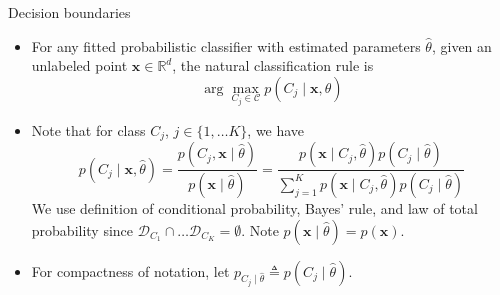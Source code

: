 \documentclass{beamer}
\numberwithin{equation}{section}
\begin{document}
\begin{frame}{Decision boundaries}
    \begin{itemize}
        \item
        For any fitted probabilistic classifier with estimated parameters
        $ \hat{\theta} $, given an unlabeled point $ \mathbf{x} \in
        \mathbb{R}^d $, the natural classification rule is
        \begin{equation} \label{class_rule}
            \arg\max_{C_j \in \mathcal{C}}p(C_j \mid \mathbf{x}, \hat{\theta})
        \end{equation}

        \item
        Note that for class $ C_j $, $ j \in \{1, \ldots K\} $, we have
        \begin{equation}
            p(C_j \mid \mathbf{x}, \hat{\theta}) =
            \frac{p(C_j, \mathbf{x} \mid \hat{\theta})}{
                p(\mathbf{x} \mid \hat{\theta})
            } = \frac{
                p(\mathbf{x} \mid C_j, \hat{\theta})p(C_j \mid \hat{\theta})
            }{
                \sum_{j = 1}^Kp(\mathbf{x} \mid C_j, \hat{\theta})
                p(C_j \mid \hat{\theta})
            }
        \end{equation}
        We use definition of conditional probability, Bayes' rule, and law of
        total probability since $ \mathcal{D}_{C_1} \cap \ldots
        \mathcal{D}_{C_K} = \emptyset $. Note
        $ p(\mathbf{x} \mid \hat{\theta}) = p(\mathbf{x}) $.

        \item
        For compactness of notation, let
        $ p_{C_j \mid \hat{\theta}} \triangleq p(C_j \mid \hat{\theta}) $.
    \end{itemize}
\end{frame}
\end{document}
